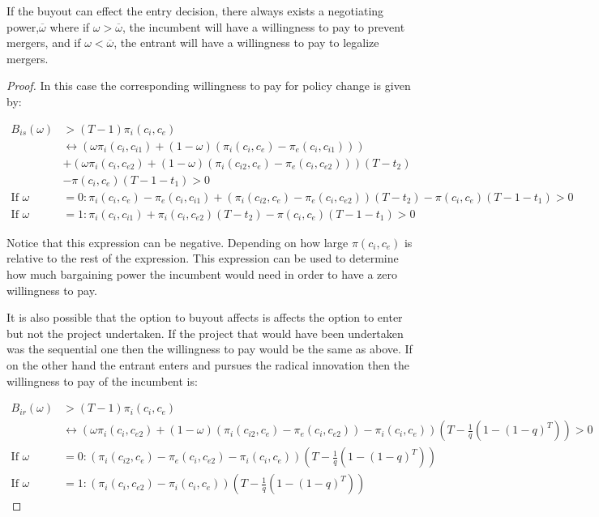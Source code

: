 \begin{proposition}
If the buyout can effect the entry decision, there always exists a negotiating power,$\overline{\omega}$ where if $\omega > \overline{\omega}$, the incumbent will have a willingness to pay to prevent mergers, and if $\omega < \overline{\omega}$, the entrant will have a willingness to pay to legalize mergers. 
\end{proposition}
\begin{proof}
In this case the corresponding willingness to pay for policy change is given by:

\begin{align*}
B_{is}(\omega)&>(T-1) \pi_i(c_i,c_e) \\
& \leftrightarrow (\omega \pi_i(c_i,c_{i1})+(1-\omega)(\pi_i(c_i,c_{e})-\pi_e(c_i,c_{i1}))) \\
&+(\omega \pi_i(c_i,c_{e2})+(1-\omega)(\pi_i(c_{i2},c_e)-\pi_e(c_{i},c_{e2})))(T-t_2)
\\&- \pi(c_i,c_e)(T-1-t_1)>0 \\
\text{If }\omega &=0: \pi_i(c_i,c_{e})-\pi_e(c_i,c_{i1}) 
+(\pi_i(c_{i2},c_e)-\pi_e(c_{i},c_{e2}))(T-t_2)
- \pi(c_i,c_e)(T-1-t_1)>0 \\
\text{If }\omega &=1: \pi_i(c_i,c_{i1})
+\pi_i(c_i,c_{e2})(T-t_2)
- \pi(c_i,c_e)(T-1-t_1)>0 
\end{align*}

Notice that this expression can be negative. Depending on how large $\pi(c_i,c_e)$ is relative to the rest of the expression. This expression can be used to determine how much bargaining power the incumbent would need in order to have a zero willingness to pay. 

It is also possible that the option to buyout affects is affects the option to enter but not the project undertaken. If the project that would have been undertaken was the sequential one then the willingness to pay would be the same as above. If on the other hand the entrant enters and pursues the radical innovation then the willingness to pay of the incumbent is: 

\begin{align*}
B_{ir}(\omega)&>(T-1)\pi_i(c_i,c_e) \\
& \leftrightarrow (\omega \pi_i(c_i,c_{e2})+(1-\omega)(\pi_{i}(c_{i2},c_{e})-\pi_{e}(c_{i},c_{e2}))-\pi_i(c_i,c_e)) \left( T - \frac{1}{q} \left( 1-(1-q)^{T} \right) \right)>0 \\
\text{If }\omega &=0: (\pi_{i}(c_{i2},c_{e})-\pi_{e}(c_{i},c_{e2})-\pi_i(c_i,c_e)) \left( T - \frac{1}{q} \left( 1-(1-q)^{T} \right) \right) \\
\text{If }\omega &=1: ( \pi_i(c_i,c_{e2})-\pi_i(c_i,c_e)) \left( T - \frac{1}{q} \left( 1-(1-q)^{T} \right) \right)
\end{align*}


\end{proof}
